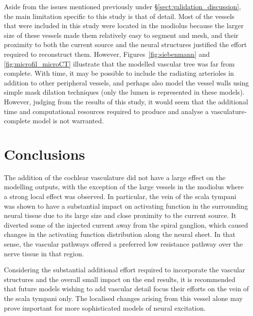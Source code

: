 Aside from the issues mentioned previously under
\S\ref{sect:validation_discussion}, the main limitation specific to this study
is that of detail. Most of the vessels that were included in this study were
located in the modiolus because the larger size of these vessels made them
relatively easy to segment and mesh, and their proximity to both the current
source and the neural structures justified the effort required to reconstruct
them. However, Figures~\ref{fig:siebenmann} and \ref{fig:microfil_microCT}
illustrate that the modelled vascular tree was far from complete. With time, it
may be possible to include the radiating arterioles in addition to other
peripheral vessels, and perhaps also model the vessel walls using simple mask
dilation techniques (only the lumen is represented in these models). However,
judging from the results of this study, it would seem that the additional time
and computational resources required to produce and analyse a
vasculature-complete model is not warranted.

\section{Conclusions}

The addition of the cochlear vasculature did not have a large effect on the
modelling outputs, with the exception of the large vessels in the modiolus where
a strong local effect was observed. In particular, the vein of the scala tympani
was shown to have a substantial impact on activating function in the surrounding
neural tissue due to its large size and close proximity to the current source.
It diverted some of the injected current away from the spiral ganglion, which
caused changes in the activating function distribution along the neural sheet.
In that sense, the vascular pathways offered a preferred low resistance pathway
over the nerve tissue in that region.

Considering the substantial additional effort required to incorporate the
vascular structures and the overall small impact on the end results, it is
recommended that future models wishing to add vascular detail focus their
efforts on the vein of the scala tympani only. The localised changes arising
from this vessel alone may prove important for more sophisticated models of
neural excitation.

